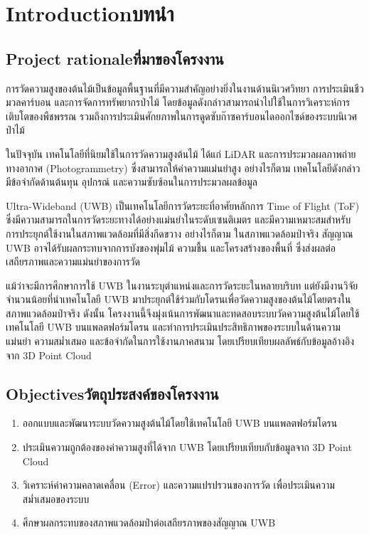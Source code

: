\chapter{\ifenglish Introduction\else บทนำ\fi}

\section{\ifenglish Project rationale\else ที่มาของโครงงาน\fi}
การวัดความสูงของต้นไม้เป็นข้อมูลพื้นฐานที่มีความสำคัญอย่างยิ่งในงานด้านนิเวศวิทยา การประเมินชีวมวลคาร์บอน และการจัดการทรัพยากรป่าไม้ โดยข้อมูลดังกล่าวสามารถนำไปใช้ในการวิเคราะห์การเติบโตของพืชพรรณ รวมถึงการประเมินศักยภาพในการดูดซับก๊าซคาร์บอนไดออกไซด์ของระบบนิเวศป่าไม้

ในปัจจุบัน เทคโนโลยีที่นิยมใช้ในการวัดความสูงต้นไม้ ได้แก่ LiDAR และการประมวลผลภาพถ่ายทางอากาศ (Photogrammetry) ซึ่งสามารถให้ค่าความแม่นยำสูง อย่างไรก็ตาม เทคโนโลยีดังกล่าวมีข้อจำกัดด้านต้นทุน อุปกรณ์ และความซับซ้อนในการประมวลผลข้อมูล

Ultra-Wideband (UWB) เป็นเทคโนโลยีการวัดระยะที่อาศัยหลักการ Time of Flight (ToF) ซึ่งมีความสามารถในการวัดระยะทางได้อย่างแม่นยำในระดับเซนติเมตร และมีความเหมาะสมสำหรับการประยุกต์ใช้งานในสภาพแวดล้อมที่มีสิ่งกีดขวาง อย่างไรก็ตาม ในสภาพแวดล้อมป่าจริง สัญญาณ UWB อาจได้รับผลกระทบจากการบังของพุ่มไม้ ความชื้น และโครงสร้างของพื้นที่ ซึ่งส่งผลต่อเสถียรภาพและความแม่นยำของการวัด

แม้ว่าจะมีการศึกษาการใช้ UWB ในงานระบุตำแหน่งและการวัดระยะในหลายบริบท แต่ยังมีงานวิจัยจำนวนน้อยที่นำเทคโนโลยี UWB มาประยุกต์ใช้ร่วมกับโดรนเพื่อวัดความสูงของต้นไม้โดยตรงในสภาพแวดล้อมป่าจริง ดังนั้น โครงงานนี้จึงมุ่งเน้นการพัฒนาและทดสอบระบบวัดความสูงต้นไม้โดยใช้เทคโนโลยี UWB บนแพลตฟอร์มโดรน และทำการประเมินประสิทธิภาพของระบบในด้านความแม่นยำ ความสม่ำเสมอ และข้อจำกัดในการใช้งานภาคสนาม โดยเปรียบเทียบผลลัพธ์กับข้อมูลอ้างอิงจาก 3D Point Cloud

\section{\ifenglish Objectives\else วัตถุประสงค์ของโครงงาน\fi}
\begin{enumerate}
    \item ออกแบบและพัฒนาระบบวัดความสูงต้นไม้โดยใช้เทคโนโลยี UWB บนแพลตฟอร์มโดรน
    \item ประเมินความถูกต้องของค่าความสูงที่ได้จาก UWB โดยเปรียบเทียบกับข้อมูลจาก 3D Point Cloud
    \item วิเคราะห์ค่าความคลาดเคลื่อน (Error) และความแปรปรวนของการวัด เพื่อประเมินความสม่ำเสมอของระบบ
    \item ศึกษาผลกระทบของสภาพแวดล้อมป่าต่อเสถียรภาพของสัญญาณ UWB
\end{enumerate}

